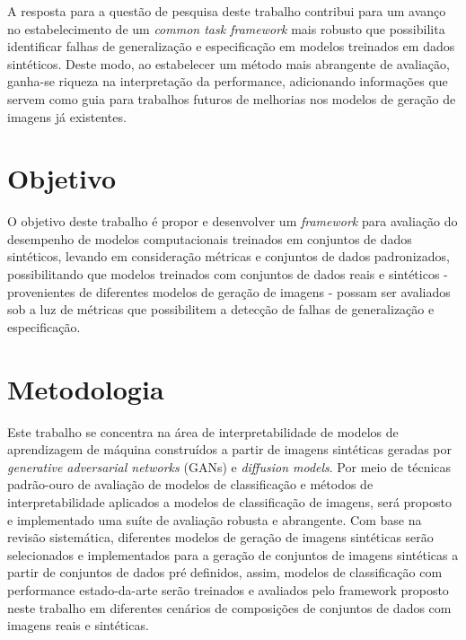 A resposta para a questão de pesquisa deste trabalho contribui para um avanço no estabelecimento de um \textit{common task framework}\cite{ctf} mais robusto que possibilita identificar falhas de generalização e especificação em modelos treinados em dados sintéticos. Deste modo, ao estabelecer um método mais abrangente de avaliação, ganha-se riqueza na interpretação da performance, adicionando informações que servem como guia para trabalhos futuros de melhorias nos modelos de geração de imagens já existentes.

\section{Objetivo}
O objetivo deste trabalho é propor e desenvolver um \textit{framework} para avaliação do desempenho de modelos computacionais treinados em conjuntos de dados sintéticos, levando em consideração métricas e conjuntos de dados padronizados, possibilitando que modelos treinados com conjuntos de dados reais e sintéticos - provenientes de diferentes modelos de geração de imagens - possam ser avaliados sob a luz de métricas que possibilitem a detecção de falhas de generalização e especificação.


\section{Metodologia}

Este trabalho se concentra na área de interpretabilidade de modelos de aprendizagem de máquina construídos a partir de imagens sintéticas geradas por \textit{generative adversarial networks} (GANs) e \textit{diffusion models}. Por meio de técnicas padrão-ouro de avaliação de modelos de classificação e métodos de interpretabilidade aplicados a modelos de classificação de imagens, será proposto e implementado uma suíte de avaliação robusta e abrangente. Com base na revisão sistemática, diferentes modelos de geração de imagens sintéticas serão selecionados e implementados para a geração de conjuntos de imagens sintéticas a partir de conjuntos de dados pré definidos, assim, modelos de classificação com performance estado-da-arte serão treinados e avaliados pelo framework proposto neste trabalho em diferentes cenários de composições de conjuntos de dados com imagens reais e sintéticas.

